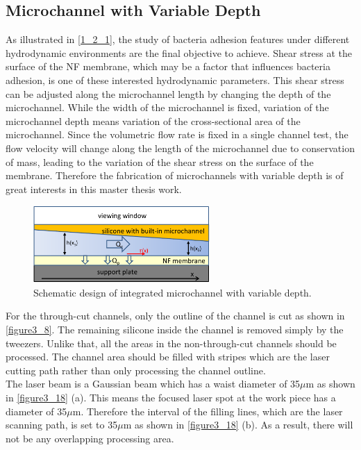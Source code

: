 \subsection{Microchannel with Variable Depth}
\label{3_4_4}
 As illustrated in \autoref{1_2_1}, the study of bacteria adhesion features under different hydrodynamic environments are the final objective to achieve. Shear stress at the surface of the NF membrane, which may be a factor that influences bacteria adhesion, is one of these interested hydrodynamic parameters. This shear stress can be adjusted along the microchannel length by changing the depth of the microchannel. While the width of the microchannel is fixed, variation of the microchannel depth means variation of the cross-sectional area of the microchannel. Since the volumetric flow rate is fixed in a single channel test, the flow velocity will change along the length of the microchannel due to conservation of mass, leading to the variation of the shear stress on the surface of the membrane. Therefore the fabrication of microchannels with variable depth is of great interests in this master thesis work.\\

\begin{figure}[h]%
\centering
\includegraphics[width=0.6\textwidth]{figures/designandfabrication/figure3_17}%
\caption{Schematic design of integrated microchannel with variable depth.}%
\label{figure3_17}%
\end{figure}

For the through-cut channels, only the outline of the channel is cut as shown in \autoref{figure3_8}. The remaining silicone inside the channel is removed simply by the tweezers. Unlike that, all the areas in the non-through-cut channels should be processed. The channel area should be filled with stripes which are the laser cutting path rather than only processing the channel outline. \\

The laser beam is a Gaussian beam which has a waist diameter of 35$\mu$m as shown in \autoref{figure3_18} (a). This means the focused laser spot at the work piece has a diameter of 35$\mu$m. Therefore the interval of the filling lines, which are the laser scanning path, is set to 35$\mu$m as shown in \autoref{figure3_18} (b). As a result, there will not be any overlapping processing area.\\

